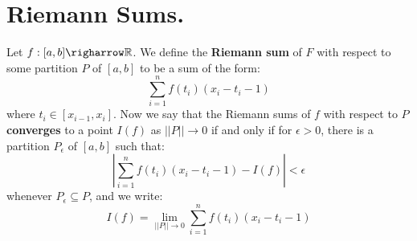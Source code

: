 

\section{Riemann Sums.}

\begin{definition}
    Let $f:[a,b] \righarrow \R$. We define the \textbf{Riemann sum} of  $F$ with
    respect to some partition  $P$ of  $[a,b]$ to be a sum of the form:
        \begin{equation}
            \sum_{i=1}^{n}{f(t_i)(x_i-t_i-1)}		
        \end{equation} 
        where $t_i \in [x_{i-1},x_i]$. Now we say that the Riemann sums of $f$
        with respect to  $P$ \textbf{converges} to a point $I(f)$ as  $||P||
        \rightarrow 0$ if and only if for  $\epsilon>0$, there is a partition
        $P_{\epsilon}$ of $[a,b]$ such that:
            \begin{equation*}
                |\sum_{i=1}^{n}{f(t_i)(x_i-t_i-1)}-I(f)|<\epsilon		
             \end{equation*} 
        whenever $P_{\epsilon} \subseteq P$, and we write:
            \begin{equation}
                I(f)=\lim_{||P|| \rightarrow 0}{\sum_{i=1}^{n}{f(t_i)(x_i-t_i-1)}}
            \end{equation} 
\end{definition}

